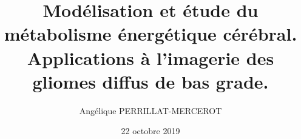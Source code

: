 
\makeatletter
\title{Modélisation et étude du métabolisme énergétique cérébral. Applications à
l'imagerie des gliomes diffus de bas grade.}\let\Title\@title
\author{Angélique PERRILLAT-MERCEROT}   \let\Author\@author
\date{22 octobre 2019}        \let\DateSoutenance\@date
\makeatother